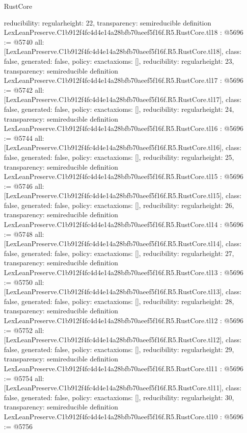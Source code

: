 \begin{lexlean}{RustCore}
\begin{coremodule}
{  reducibility: regular{height: 22},
  transparency: semireducible
}
definition LexLeanPreserve.C1b912f4fc4d4e14a28bfb70aeef5f16f.R5.RustCore.tl18 : @5696 := @5740 {
  all: [LexLeanPreserve.C1b912f4fc4d4e14a28bfb70aeef5f16f.R5.RustCore.tl18],
  class: false,
  generated: false,
  policy: exact{axioms: []},
  reducibility: regular{height: 23},
  transparency: semireducible
}
definition LexLeanPreserve.C1b912f4fc4d4e14a28bfb70aeef5f16f.R5.RustCore.tl17 : @5696 := @5742 {
  all: [LexLeanPreserve.C1b912f4fc4d4e14a28bfb70aeef5f16f.R5.RustCore.tl17],
  class: false,
  generated: false,
  policy: exact{axioms: []},
  reducibility: regular{height: 24},
  transparency: semireducible
}
definition LexLeanPreserve.C1b912f4fc4d4e14a28bfb70aeef5f16f.R5.RustCore.tl16 : @5696 := @5744 {
  all: [LexLeanPreserve.C1b912f4fc4d4e14a28bfb70aeef5f16f.R5.RustCore.tl16],
  class: false,
  generated: false,
  policy: exact{axioms: []},
  reducibility: regular{height: 25},
  transparency: semireducible
}
definition LexLeanPreserve.C1b912f4fc4d4e14a28bfb70aeef5f16f.R5.RustCore.tl15 : @5696 := @5746 {
  all: [LexLeanPreserve.C1b912f4fc4d4e14a28bfb70aeef5f16f.R5.RustCore.tl15],
  class: false,
  generated: false,
  policy: exact{axioms: []},
  reducibility: regular{height: 26},
  transparency: semireducible
}
definition LexLeanPreserve.C1b912f4fc4d4e14a28bfb70aeef5f16f.R5.RustCore.tl14 : @5696 := @5748 {
  all: [LexLeanPreserve.C1b912f4fc4d4e14a28bfb70aeef5f16f.R5.RustCore.tl14],
  class: false,
  generated: false,
  policy: exact{axioms: []},
  reducibility: regular{height: 27},
  transparency: semireducible
}
definition LexLeanPreserve.C1b912f4fc4d4e14a28bfb70aeef5f16f.R5.RustCore.tl13 : @5696 := @5750 {
  all: [LexLeanPreserve.C1b912f4fc4d4e14a28bfb70aeef5f16f.R5.RustCore.tl13],
  class: false,
  generated: false,
  policy: exact{axioms: []},
  reducibility: regular{height: 28},
  transparency: semireducible
}
definition LexLeanPreserve.C1b912f4fc4d4e14a28bfb70aeef5f16f.R5.RustCore.tl12 : @5696 := @5752 {
  all: [LexLeanPreserve.C1b912f4fc4d4e14a28bfb70aeef5f16f.R5.RustCore.tl12],
  class: false,
  generated: false,
  policy: exact{axioms: []},
  reducibility: regular{height: 29},
  transparency: semireducible
}
definition LexLeanPreserve.C1b912f4fc4d4e14a28bfb70aeef5f16f.R5.RustCore.tl11 : @5696 := @5754 {
  all: [LexLeanPreserve.C1b912f4fc4d4e14a28bfb70aeef5f16f.R5.RustCore.tl11],
  class: false,
  generated: false,
  policy: exact{axioms: []},
  reducibility: regular{height: 30},
  transparency: semireducible
}
definition LexLeanPreserve.C1b912f4fc4d4e14a28bfb70aeef5f16f.R5.RustCore.tl10 : @5696 := @5756 {
}
\end{coremodule}
\end{lexlean}
